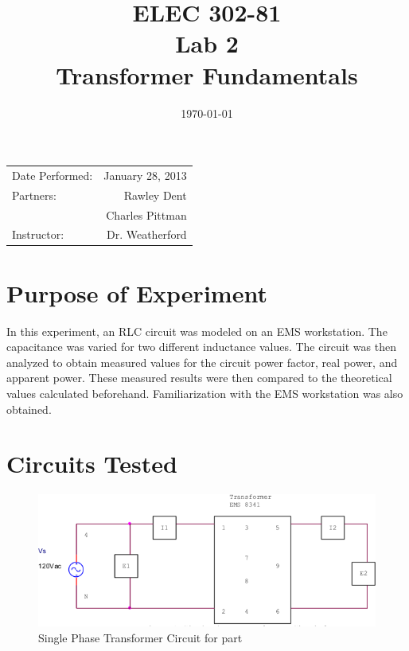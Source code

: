 \documentclass{article}
\title{ELEC 302-81\\ Lab 2\\ Transformer Fundamentals} %
\date{\today} %
\begin{document}
\maketitle

\begin{center}
  \begin{tabular}{lr}
    Date Performed: & January 28, 2013 \\
    Partners: & Rawley Dent \\
              & Charles Pittman \\
    Instructor: & Dr. Weatherford
  \end{tabular}
\end{center}

\pagebreak


\section{Purpose of Experiment}
In this experiment, an RLC circuit was modeled on an EMS workstation.  The
capacitance was varied for two different inductance values. The circuit was
then analyzed to obtain measured values for the circuit power factor, real
power, and apparent power. These measured results were then compared to the
theoretical values calculated beforehand. Familiarization with the EMS
workstation was also obtained.

\section{Circuits Tested}
\begin{figure}[h]
  \begin{center}
    \includegraphics[width=.8\textwidth]{circuit_01}
    \caption{Single Phase Transformer Circuit for part }
    \label{fig:circuit_01}
  \end{center}
\end{figure}
\end{document}
